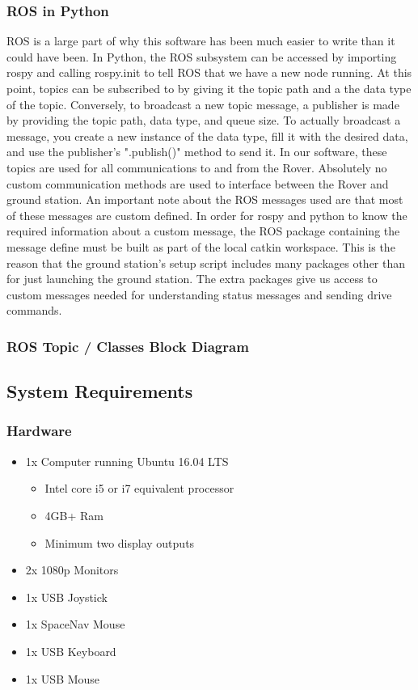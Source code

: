 \subsubsection{ROS in Python}
ROS is a large part of why this software has been much easier to write than it could have been. In Python, the ROS subsystem can be accessed by importing rospy and calling rospy.init to tell ROS that we have a new node running. At this point, topics can be subscribed to by giving it the topic path and a the data type of the topic. Conversely, to broadcast a new topic message, a publisher is made by providing the topic path, data type, and queue size. To actually broadcast a message, you create a new instance of the data type, fill it with the desired data, and use the publisher's ".publish()" method to send it. In our software, these topics are used for all communications to and from the Rover. Absolutely no custom communication methods are used to interface between the Rover and ground station. An important note about the ROS messages used are that most of these messages are custom defined. In order for rospy and python to know the required information about a custom message, the ROS package containing the message define must be built as part of the local catkin workspace. This is the reason that the ground station's setup script includes many packages other than for just launching the ground station. The extra packages give us access to custom messages needed for understanding status messages and sending drive commands.

\subsubsection{ROS Topic / Classes Block Diagram}



\subsection{System Requirements}
\subsubsection{Hardware}
\begin{itemize}
\item 1x Computer running Ubuntu 16.04 LTS
	\begin{itemize}
	\item Intel core i5 or i7 equivalent processor
    \item 4GB+ Ram
    \item Minimum two display outputs
	\end{itemize}
\item 2x 1080p Monitors
\item 1x USB Joystick
\item 1x SpaceNav Mouse
\item 1x USB Keyboard
\item 1x USB Mouse
\end{itemize}

